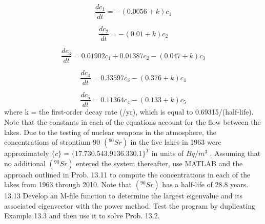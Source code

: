 \documentclass[../main.tex]{subfiles}
\begin{document}
\begin{equation}
\frac{dc_{1}}{dt}=-(0.0056+k)c_{1}
\end{equation}

\begin{equation}
\frac{dc_{2}}{dt}=-(0.01+k)c_{2}
\end{equation}

\begin{equation}
\frac{dc_{3}}{dt}=0.01902c_{1}+0.01387c_{2}-(0.047+k)c_{3}
\end{equation}

\begin{equation}
\frac{dc_{4}}{dt}=0.33597c_{3}-(0.376+k)c_{4}
\end{equation}

\begin{equation}
\frac{dc_{5}}{dt}=0.11364c_{4}-(0.133+k)c_{5}
\end{equation}
where k = the first-order decay rate (/yr), which is equal to
0.69315/(half-life). Note that the constants in each of the equations account for the flow between the lakes. Due to the
testing of nuclear weapons in the atmosphere, the concentrations of strontium-90 $(^{90}Sr)$ in the five lakes in 1963 were
approximately $\{c\} = \{17.7 30.5 43.9 136.3 30.1\}^{T}$ in units
of $Bq/m^{3}$
. Assuming that no additional $(^{90}Sr)$ entered the system thereafter, use MATLAB and the approach outlined in
Prob. 13.11 to compute the concentrations in each of the
lakes from 1963 through 2010. Note that $(^{90}Sr)$ has a half-life
of 28.8 years.
13.13 Develop an M-file function to determine the largest
eigenvalue and its associated eigenvector with the power
method. Test the program by duplicating Example 13.3 and
then use it to solve Prob. 13.2.
\end{document}
